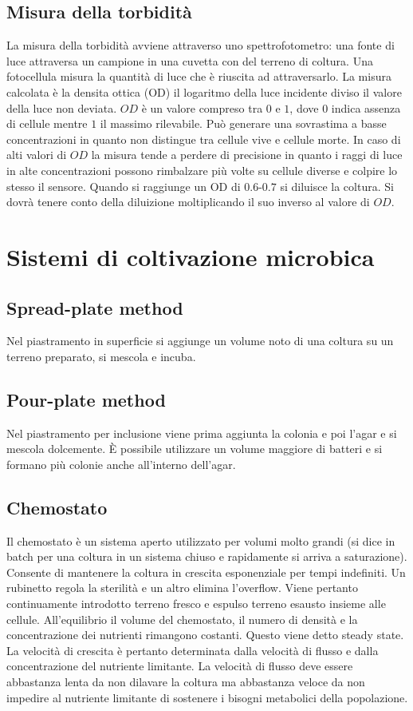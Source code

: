 	\subsection{Misura della torbidit\`a}
	La misura della torbidit\`a avviene attraverso uno spettrofotometro: una fonte di luce attraversa un campione in una cuvetta con del terreno di coltura.
	Una fotocellula misura la quantit\`a di luce che \`e riuscita ad attraversarlo. 
	La misura calcolata \`e la densita ottica (OD) il logaritmo della luce incidente diviso il valore della luce non deviata. 
	$OD$ \`e un valore compreso tra $0$ e $1$, dove $0$ indica assenza di cellule mentre $1$ il massimo rilevabile.
	Pu\`o generare una sovrastima a basse concentrazioni in quanto non distingue tra cellule vive e cellule morte.
	In caso di alti valori di $OD$ la misura tende a perdere di precisione in quanto i raggi di luce in alte concentrazioni possono rimbalzare pi\`u volte su cellule diverse e colpire lo stesso il sensore. 
	Quando si raggiunge un OD di $0.6$-$0.7$ si diluisce la coltura. 
	Si dovr\`a tenere conto della diluizione moltiplicando il suo inverso al valore di $OD$.

\section{Sistemi di coltivazione microbica}

	\subsection{Spread-plate method}
	Nel piastramento in superficie si aggiunge un volume noto di una coltura su un terreno preparato, si mescola e incuba.

	\subsection{Pour-plate method}
	Nel piastramento per inclusione viene prima aggiunta la colonia e poi l'agar e si mescola dolcemente.
	\`E possibile utilizzare un volume maggiore di batteri e si formano pi\`u colonie anche all'interno dell'agar.

	\subsection{Chemostato}
	Il chemostato \`e un sistema aperto utilizzato per volumi molto grandi (si dice in batch per una coltura in un sistema chiuso e rapidamente si arriva a saturazione).
	Consente di mantenere la coltura in crescita esponenziale per tempi indefiniti. 
	Un rubinetto regola la sterilit\`a e un altro elimina l'overflow. 
	Viene pertanto continuamente introdotto terreno fresco e espulso terreno esausto insieme alle cellule. 
	All'equilibrio il volume del chemostato, il numero di densit\`a e la concentrazione dei nutrienti rimangono costanti.
	Questo viene detto steady state.
	La velocit\`a di crescita \`e pertanto determinata dalla velocit\` a di flusso e dalla concentrazione del nutriente limitante. 
	La velocit\`a di flusso deve essere abbastanza lenta da non dilavare la coltura ma abbastanza veloce da non impedire al nutriente limitante di sostenere i bisogni metabolici della popolazione.

